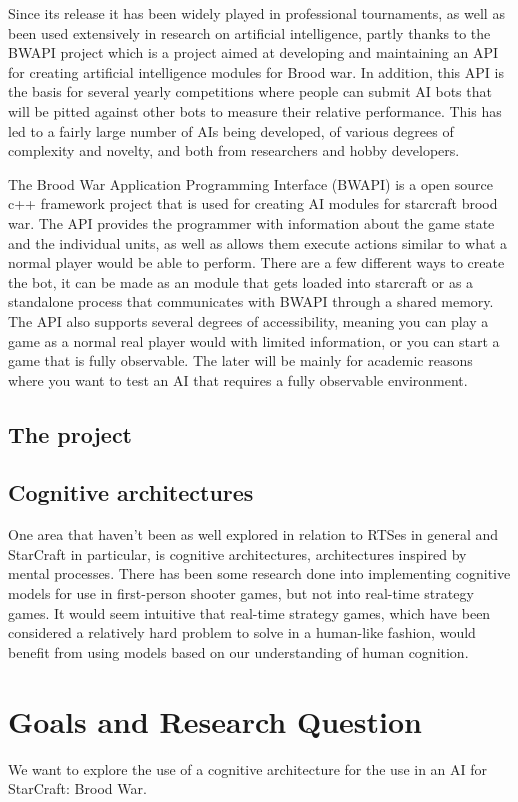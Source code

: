 Since its release it has been widely played in professional tournaments, as well as been used extensively in research on artificial intelligence, partly thanks to the BWAPI project which is a project aimed at developing and maintaining an API
for creating artificial intelligence modules for Brood war. In addition, this API is the basis for several yearly competitions where people can submit AI bots that will be pitted against other bots to measure their relative performance. This has led to a fairly large number of
AIs being developed, of various degrees of complexity and novelty, and both from researchers and hobby developers. 

The Brood War Application Programming Interface (BWAPI) is a open source c++ framework project that is used for creating AI modules for starcraft brood war. The API provides the programmer with information about the game state and the individual units, as well as allows them execute actions similar to what a normal player would be able to perform. There are a few different ways to create the bot, it can be made as an module that gets loaded into starcraft or as a standalone process that communicates with BWAPI through a shared memory. The API also supports several degrees of accessibility, meaning you can play a game as a normal real player would with limited information, or you can start a game that is fully observable. The later will be mainly for academic reasons where you want to test an AI that requires a fully observable environment.  

\subsection{The project}


\subsection{Cognitive architectures}
One area that haven't been as well explored in relation to RTSes in general and
StarCraft in particular, is cognitive architectures, architectures inspired by
mental processes. There has been some research done into implementing cognitive
models for use in first-person shooter games, but not into real-time strategy
games. It would seem intuitive that real-time strategy games, which have been
considered a relatively hard problem to solve in a human-like fashion, would
benefit from using models based on our understanding of human cognition.


\section{Goals and Research Question}
We want to explore the use of a cognitive architecture for the use in an AI for
StarCraft: Brood War.

